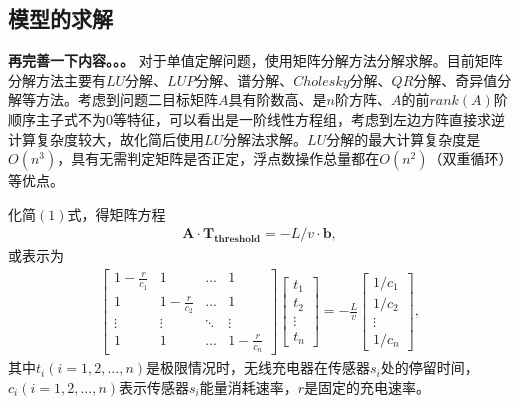 \documentclass{whutmod}
\begin{document}
    		

		
		
		\subsection{模型的求解}
		\textbf{再完善一下内容。。。}
		对于单值定解问题，使用矩阵分解方法分解求解。目前矩阵分解方法主要有$LU$分解、$LUP$分解、谱分解、$Cholesky$分解、$QR$分解、奇异值分解等方法。考虑到问题二目标矩阵$A$具有阶数高、是$n$阶方阵、$A$的前$rank(A)$阶顺序主子式不为$0$等特征，可以看出是一阶线性方程组，考虑到左边方阵直接求逆计算复杂度较大，故化简后使用$LU$分解法求解。$LU$分解的最大计算复杂度是$O(n^3)$，具有无需判定矩阵是否正定，浮点数操作总量都在$O(n^2)$（双重循环）等优点。
		
		化简$(1)$式，得矩阵方程
		\begin{gather}
		\bm A \cdot \bm{T_{threshold}}=-L/v \cdot \bm b,
		\end{gather}
		或表示为
		\begin{gather}
		\begin{bmatrix}
		1-\frac{r}{c_1} & 1 & ... & 1 \\ 
		1 & 1-\frac{r}{c_2} & ... & 1\\ 
		\vdots  & \vdots & \ddots  & \vdots \\ 
		1 & 1 & ... & 1-\frac{r}{c_n}
		\end{bmatrix}\begin{bmatrix}
		t_1\\ t_2\\ \vdots\\ t_n
		\end{bmatrix}=-\frac{L}{v}
		\begin{bmatrix}
		1/c_1\\ 1/c_2\\ \vdots\\ 1/c_n
		\end{bmatrix},
		\end{gather}
		其中$t_i(i=1,2,...,n)$是极限情况时，无线充电器在传感器$s_i$处的停留时间，$c_i(i=1,2,...,n)$表示传感器$s_i$能量消耗速率，$r$是固定的充电速率。
		
\end{document}
